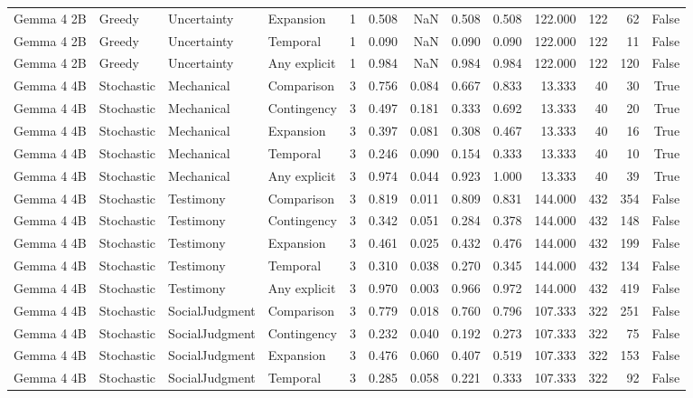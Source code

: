 \begin{tabular}{llllrrrrrrrrr}
Gemma 4 2B & Greedy & Uncertainty & Expansion & 1 & 0.508 & NaN & 0.508 & 0.508 & 122.000 & 122 & 62 & False \\
Gemma 4 2B & Greedy & Uncertainty & Temporal & 1 & 0.090 & NaN & 0.090 & 0.090 & 122.000 & 122 & 11 & False \\
Gemma 4 2B & Greedy & Uncertainty & Any explicit & 1 & 0.984 & NaN & 0.984 & 0.984 & 122.000 & 122 & 120 & False \\
Gemma 4 4B & Stochastic & Mechanical & Comparison & 3 & 0.756 & 0.084 & 0.667 & 0.833 & 13.333 & 40 & 30 & True \\
Gemma 4 4B & Stochastic & Mechanical & Contingency & 3 & 0.497 & 0.181 & 0.333 & 0.692 & 13.333 & 40 & 20 & True \\
Gemma 4 4B & Stochastic & Mechanical & Expansion & 3 & 0.397 & 0.081 & 0.308 & 0.467 & 13.333 & 40 & 16 & True \\
Gemma 4 4B & Stochastic & Mechanical & Temporal & 3 & 0.246 & 0.090 & 0.154 & 0.333 & 13.333 & 40 & 10 & True \\
Gemma 4 4B & Stochastic & Mechanical & Any explicit & 3 & 0.974 & 0.044 & 0.923 & 1.000 & 13.333 & 40 & 39 & True \\
Gemma 4 4B & Stochastic & Testimony & Comparison & 3 & 0.819 & 0.011 & 0.809 & 0.831 & 144.000 & 432 & 354 & False \\
Gemma 4 4B & Stochastic & Testimony & Contingency & 3 & 0.342 & 0.051 & 0.284 & 0.378 & 144.000 & 432 & 148 & False \\
Gemma 4 4B & Stochastic & Testimony & Expansion & 3 & 0.461 & 0.025 & 0.432 & 0.476 & 144.000 & 432 & 199 & False \\
Gemma 4 4B & Stochastic & Testimony & Temporal & 3 & 0.310 & 0.038 & 0.270 & 0.345 & 144.000 & 432 & 134 & False \\
Gemma 4 4B & Stochastic & Testimony & Any explicit & 3 & 0.970 & 0.003 & 0.966 & 0.972 & 144.000 & 432 & 419 & False \\
Gemma 4 4B & Stochastic & SocialJudgment & Comparison & 3 & 0.779 & 0.018 & 0.760 & 0.796 & 107.333 & 322 & 251 & False \\
Gemma 4 4B & Stochastic & SocialJudgment & Contingency & 3 & 0.232 & 0.040 & 0.192 & 0.273 & 107.333 & 322 & 75 & False \\
Gemma 4 4B & Stochastic & SocialJudgment & Expansion & 3 & 0.476 & 0.060 & 0.407 & 0.519 & 107.333 & 322 & 153 & False \\
Gemma 4 4B & Stochastic & SocialJudgment & Temporal & 3 & 0.285 & 0.058 & 0.221 & 0.333 & 107.333 & 322 & 92 & False \\

\end{tabular}
